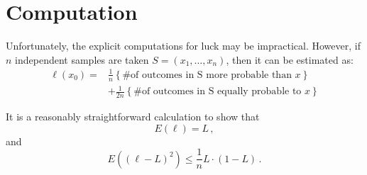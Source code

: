 \chapter*{Computation}

Unfortunately, the explicit computations for luck may be impractical.  However, if $n$ independent samples are taken $S=(x_1, \ldots, x_n)$, then it can be estimated as: 
\begin{align*}
 \ell(x_0) = & \frac{1}{n} \left\{\text{\# of outcomes in S more probable than $x$}\right\}  \\
 & + \frac{1}{2n} \left\{\text{\# of outcomes in S equally probable to $x$}\right\} 
\end{align*}

It is a reasonably straightforward calculation to show that
\begin{equation}
E(\ell)=L \,,
\end{equation}
and
\begin{equation}
E((\ell-L)^2) \leq \frac{1}{n} L \cdot (1-L)\,.
\end{equation}
